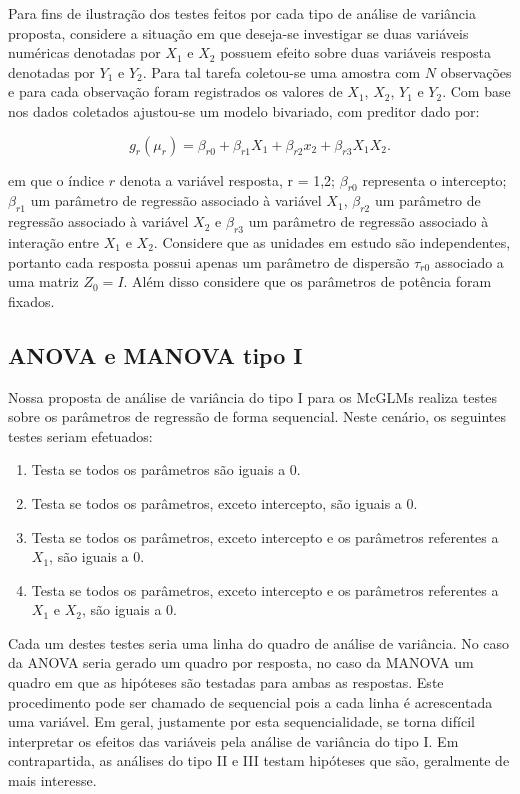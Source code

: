Para fins de ilustração dos testes feitos por cada tipo de análise de variância proposta, considere a situação em que deseja-se investigar se duas variáveis numéricas denotadas por $X_1$ e $X_2$ possuem efeito sobre duas variáveis resposta denotadas por $Y_1$ e $Y_2$. Para tal tarefa coletou-se uma amostra com $N$ observações e para cada observação foram registrados os valores de $X_1$, $X_2$, $Y_1$ e $Y_2$. Com base nos dados coletados ajustou-se um modelo bivariado, com preditor dado por:

$$
g_r(\mu_r) = \beta_{r0} + \beta_{r1} X_1 + \beta_{r2} x_2 + \beta_{r3} X_1X_2.
$$

\noindent em que o índice $r$ denota a variável resposta, r = 1,2; $\beta_{r0}$ representa o intercepto; $\beta_{r1}$ um parâmetro de regressão associado à variável $X_1$, $\beta_{r2}$ um parâmetro de regressão associado à variável $X_2$ e $\beta_{r3}$ um parâmetro de regressão associado à interação entre $X_1$ e $X_2$. Considere que as unidades em estudo são independentes, portanto cada resposta possui apenas um parâmetro de dispersão $\tau_{r0}$ associado a uma matriz $Z_0 = I$. Além disso considere que os parâmetros de potência foram fixados.

\subsection{ANOVA e MANOVA tipo I}

Nossa proposta de análise de variância do tipo I para os McGLMs realiza testes sobre os parâmetros de regressão de forma sequencial. Neste cenário, os seguintes testes seriam efetuados:

\begin{enumerate}
  \item Testa se todos os parâmetros são iguais a 0.
  \item Testa se todos os parâmetros, exceto intercepto, são iguais a 0.
  \item Testa se todos os parâmetros, exceto intercepto e os parâmetros referentes a $X_1$, são iguais a 0.
  \item Testa se todos os parâmetros, exceto intercepto e os parâmetros referentes a $X_1$ e $X_2$, são iguais a 0.
\end{enumerate}

Cada um destes testes seria uma linha do quadro de análise de variância. No caso da ANOVA seria gerado um quadro por resposta, no caso da MANOVA um quadro em que as hipóteses são testadas para ambas as respostas. Este procedimento pode ser chamado de sequencial pois a cada linha é acrescentada uma variável. Em geral, justamente por esta sequencialidade, se torna difícil interpretar os efeitos das variáveis pela análise de variância do tipo I. Em contrapartida, as análises do tipo II e III testam hipóteses que são, geralmente de mais interesse.


